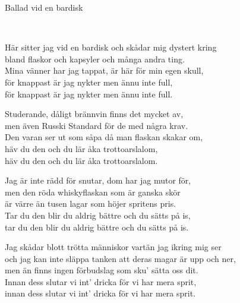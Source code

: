 \begin{song}{Ballad vid en bardisk}
	
	
	\\

    \showversenumber	
	Här sitter jag vid en bardisk och skådar mig dystert kring\\
	bland flaskor och kapsyler och många andra ting.\\
	Mina vänner har jag tappat, är här för min egen skull,\\
	för knappast är jag nykter men ännu inte full,\\
	för knappast är jag nykter men ännu inte full.
	
    \showversenumber
	Studerande, dåligt brännvin finns det mycket av,\\
	men även Russki Standard för de med några krav.\\
	Den varan ser ut som såpa då man flaskan skakar om,\\
	häv du den och du lär åka trottoarslalom,\\
	häv du den och du lär åka trottoarslalom.
	
    \showversenumber
	Jag är inte rädd för snutar, dom har jag mutor för,\\
	men den röda whiskyflaskan som är ganska skör\\
	är värre än tusen lagar som höjer spritens pris.\\
	Tar du den blir du aldrig bättre och du sätts på is,\\
	tar du den blir du aldrig bättre och du sätts på is.
	
    \showversenumber
	Jag skådar blott trötta människor vartän jag ikring mig ser\\
	och jag kan inte släppa tanken att deras magar är upp och ner,\\
	men än finns ingen förbudslag som sku' sätta oss dit.\\
	Innan dess slutar vi int' dricka för vi har mera sprit,\\
	innan dess slutar vi int' dricka för vi har mera sprit.
	
\end{song}
